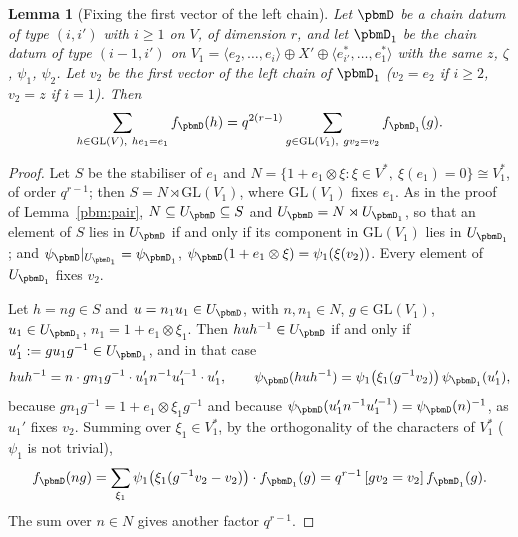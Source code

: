 \documentclass[10pt]{amsart}
\newtheorem{lemma}[theorem]{Lemma}
\theoremstyle{definition}
\theoremstyle{remark}
\providecommand{\auGL}{\mathrm{GL}}
\begin{document}
\begin{lemma}[Fixing the first vector of the left chain]\label{pbm:first}
Let $\pbmD$ be a chain datum of type $(i,i')$ with $i\ge1$ on $V$, of dimension $r$, and let
$\pbmD_1$ be the chain datum of type $(i-1,i')$ on $V_1=\langle e_2,\dots,e_i\rangle\oplus X'\oplus
\langle e^*_{i'},\dots,e^*_1\rangle$ with the same $z$, $\zeta$, $\psi_1$, $\psi_2$. Let $v_2$ be
the first vector of the left chain of $\pbmD_1$ ($v_2=e_2$ if $i\ge2$, $v_2=z$ if $i=1$). Then
\[
\sum_{h\in\auGL(V),\ he_1=e_1}f_\pbmD(h)=q^{2(r-1)}\sum_{g\in\auGL(V_1),\ gv_2=v_2}f_{\pbmD_1}(g).
\]
\end{lemma}
\begin{proof}
Let $S$ be the stabiliser of $e_1$ and $N=\{1+e_1\otimes\xi:\xi\in V^*,\ \xi(e_1)=0\}\cong V_1^*$, of
order $q^{r-1}$; then $S=N\rtimes\auGL(V_1)$, where $\auGL(V_1)$ fixes $e_1$. As in the proof of
Lemma~\ref{pbm:pair}, $N\subseteq U_\pbmD\subseteq S$ and $U_\pbmD=N\rtimes U_{\pbmD_1}$, so that an
element of $S$ lies in $U_\pbmD$ if and only if its component in $\auGL(V_1)$ lies in
$U_{\pbmD_1}$; and $\psi_\pbmD|_{U_{\pbmD_1}}=\psi_{\pbmD_1}$, $\psi_\pbmD(1+e_1\otimes\xi)=\psi_1(\xi(
v_2))$. Every element of $U_{\pbmD_1}$ fixes $v_2$.

Let $h=ng\in S$ and $u=n_1u_1\in U_\pbmD$, with $n,n_1\in N$, $g\in\auGL(V_1)$, $u_1\in U_{\pbmD_1}$,
$n_1=1+e_1\otimes\xi_1$. Then $huh^{-1}\in U_\pbmD$ if and only if $u_1':=gu_1g^{-1}\in U_{\pbmD_1}$,
and in that case
\[
huh^{-1}=n\cdot gn_1g^{-1}\cdot u_1'n^{-1}u_1'^{-1}\cdot u_1',\qquad\psi_\pbmD(huh^{-1})=\psi_1\bigl(
\xi_1(g^{-1}v_2)\bigr)\,\psi_{\pbmD_1}(u_1'),
\]
because $gn_1g^{-1}=1+e_1\otimes\xi_1g^{-1}$ and because $\psi_\pbmD(u_1'n^{-1}u_1'^{-1})=\psi_\pbmD(n)^{-1}$,
as $u_1'$ fixes $v_2$. Summing over $\xi_1\in V_1^*$, by the orthogonality of the characters of
$V_1^*$ ($\psi_1$ is not trivial),
\[
f_\pbmD(ng)=\sum_{\xi_1}\psi_1\bigl(\xi_1(g^{-1}v_2-v_2)\bigr)\cdot f_{\pbmD_1}(g)=q^{r-1}\,[gv_2=v_2]\,
f_{\pbmD_1}(g).
\]
The sum over $n\in N$ gives another factor $q^{r-1}$.
\end{proof}
\end{document}
